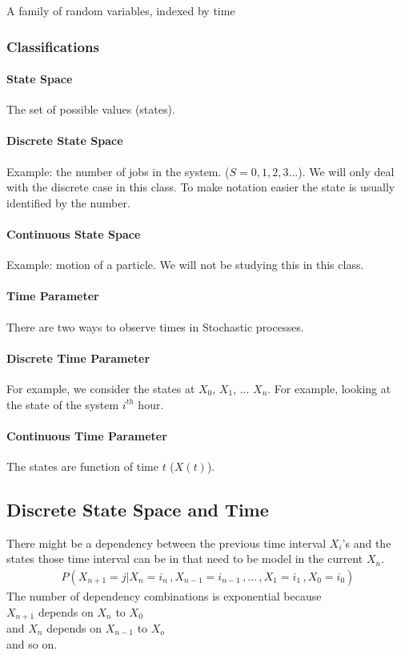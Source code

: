 
A family of random variables, indexed by time

\subsubsection{Classifications}

\paragraph{State Space} The set of possible values (states).
\paragraph{Discrete State Space} Example: the number of jobs in the system.
($S = {0,1,2,3...}$). We will only deal with the discrete case in this class. To
make notation easier the state is usually identified by the number.

\paragraph{Continuous State Space} Example: motion of a particle. We will not be
studying this in this class.

\paragraph{Time Parameter} There are two ways to observe times in Stochastic
processes.

\paragraph{Discrete Time Parameter} For example, we consider the states at
$X_0$, $X_1$, ... $X_n$. For example, looking at the state of the system
$i^{th}$ hour.

%

\paragraph{Continuous Time Parameter}
The states are function of time $t$ ($X(t)$).

\subsection{Discrete State Space and Time} There might be a dependency
between the previous time interval $X_i$'s and the states those time interval
can be in that need to be model in the current $X_n$. 
\begin{equation*} \begin{split}
	P(X_{n+1} = j | X_n = i_n\, , X_{n-1} = i_{n-1}\, , ... \, , X_1 = i_1\, ,X_0 = i_0)
\end{split} \end{equation*}
The number of dependency combinations is exponential because \\
$X_{n+1}$ depends on $X_n$ to $X_0$ \\
and $X_{n}$ depends on $X_{n-1}$ to $X_o$ \\
and so on. 

